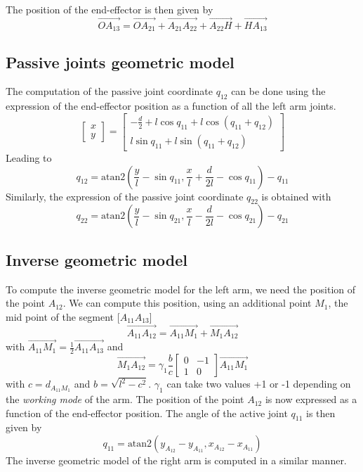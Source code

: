 \documentclass[a4paper]{article}
\begin{document}
The position of the end-effector is then given by
\begin{equation}
    \overrightarrow{OA_{13}}=\overrightarrow{OA_{21}}+\overrightarrow{A_{21}A_{22}}+\overrightarrow{A_{22}H}+\overrightarrow{HA_{13}}
\end{equation}
\subsection{Passive joints geometric model}
The computation of the passive joint coordinate $q_{12}$ can be done using the expression of the end-effector position as a function of all the left arm joints.
%
\begin{equation}
    \begin{bmatrix}x\\y\end{bmatrix}=
    \begin{bmatrix}
    -\frac{d}{2}+l\cos{q_{11}}+l\cos{(q_{11}+q_{12})}\\
    l\sin{q_{11}}+l\sin{(q_{11}+q_{12})}
    \end{bmatrix}
\end{equation}
%
Leading to
%
\begin{equation}
    q_{12} = \text{atan2}\left(\frac{y}{l}-\sin{q_{11}},\frac{x}{l}+\frac{d}{2l}-\cos{q_{11}}\right) -q_{11}
\end{equation}
%
Similarly, the expression of the passive joint coordinate $q_{22}$ is obtained with
%
\begin{equation}
    q_{22} = \text{atan2}\left(\frac{y}{l}-\sin{q_{21}},\frac{x}{l}-\frac{d}{2l}-\cos{q_{21}}\right) - q_{21}
\end{equation}
\subsection{Inverse geometric model}
To compute the inverse geometric model for the left arm, we need the position of the point $A_{12}$. We can compute this position, using an additional point $M_1$, the mid point of the segment [$A_{11}A_{13}$]
\begin{equation}
    \overrightarrow{A_{11}A_{12}} = \overrightarrow{A_{11}M_1} + \overrightarrow{M_1A_{12}}
\end{equation}
%
with $\overrightarrow{A_{11}M_1}=\frac{1}{2}\overrightarrow{A_{11}A_{13}}$ and
\begin{equation}
    \overrightarrow{M_1A_{12}} = \gamma_1\frac{b}{c}\begin{bmatrix}
        0 & -1\\
        1 & 0
    \end{bmatrix}\overrightarrow{A_{11}M_1}
\end{equation}
%
with $c = d_{A_{11}M_1}$ and $b=\sqrt{l^2-c^2}$. $\gamma_1$ can take two values +1 or -1 depending on the \textit{working mode} of the arm. The position of the point $A_{12}$ is now expressed as a function of the end-effector position.
%
The angle of the active joint $q_{11}$ is then given by
\begin{equation}
    q_{11} = \text{atan2}(y_{A_{12}}-y_{A_{11}}, x_{A_{12}}-x_{A_{11}})
\end{equation}
%
The inverse geometric model of the right arm is computed in a similar manner.
%
\end{document}
